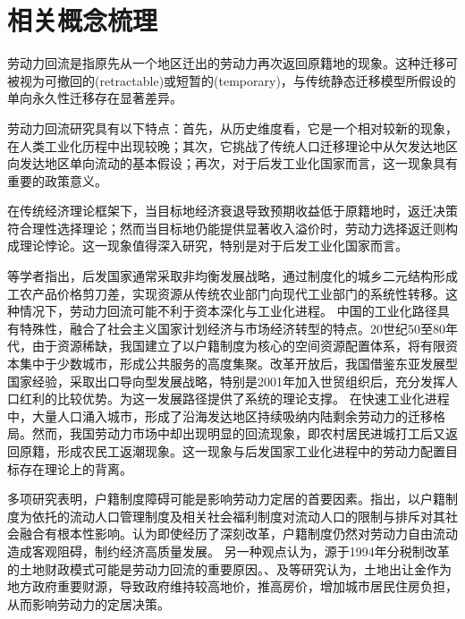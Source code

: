 \documentclass[master, final]{zufe-thesis}
\begin{document}
\section{相关概念梳理}
劳动力回流是指原先从一个地区迁出的劳动力再次返回原籍地的现象。这种迁移可被视为可撤回的(retractable)或短暂的(temporary)，与传统静态迁移模型所假设的单向永久性迁移存在显著差异。

劳动力回流研究具有以下特点：首先，从历史维度看，它是一个相对较新的现象，在人类工业化历程中出现较晚；其次，它挑战了传统人口迁移理论中从欠发达地区向发达地区单向流动的基本假设；再次，对于后发工业化国家而言，这一现象具有重要的政策意义。

在传统经济理论框架下，当目标地经济衰退导致预期收益低于原籍地时，返迁决策符合理性选择理论；然而当目标地仍能提供显著收入溢价时，劳动力选择返迁则构成理论悖论。这一现象值得深入研究，特别是对于后发工业化国家而言。

\textcite{CaiFangHuJiZhiDuYuLaoDongLiShiChangBaoHu2001}等学者指出，后发国家通常采取非均衡发展战略，通过制度化的城乡二元结构形成工农产品价格剪刀差，实现资源从传统农业部门向现代工业部门的系统性转移。这种情况下，劳动力回流可能不利于资本深化与工业化进程。
中国的工业化路径具有特殊性，融合了社会主义国家计划经济与市场经济转型的特点。20世纪50至80年代，由于资源稀缺，我国建立了以户籍制度为核心的空间资源配置体系，将有限资本集中于少数城市，形成公共服务的高度集聚。改革开放后，我国借鉴东亚发展型国家经验，采取出口导向型发展战略，特别是2001年加入世贸组织后，充分发挥人口红利的比较优势。\textcite{LinYiFuZhongGuoDeJingJiFaZhanZhanLueYuDiQuShouRuChaiJu2003}为这一发展路径提供了系统的理论支撑。
在快速工业化进程中，大量人口涌入城市，形成了沿海发达地区持续吸纳内陆剩余劳动力的迁移格局。然而，我国劳动力市场中却出现明显的回流现象，即农村居民进城打工后又返回原籍，形成农民工返潮现象。这一现象与后发国家工业化进程中的劳动力配置目标存在理论上的背离。

多项研究表明，户籍制度障碍可能是影响劳动力定居的首要因素。\textcite{RenYuanChengShiLiuDongRenKouDeSheHuiRongHeWenXianShuPing2006}指出，以户籍制度为依托的流动人口管理制度及相关社会福利制度对流动人口的限制与排斥对其社会融合有根本性影响。\textcite{LuYiLongHuKouHuanQiZuoYongMaHuJiZhiDuYuSheHuiFenCengHeLiuDong2008}认为即使经历了深刻改革，户籍制度仍然对劳动力自由流动造成客观阻碍，制约经济高质量发展。
另一种观点认为，源于1994年分税制改革的土地财政模式可能是劳动力回流的重要原因。\textcite{ChenYingFangNongMinGongZhiDuAnPaiYuShenFenRenTong2005}、\textcite{niehuihuaZhongguogaofangjiadexinzhengzhijingjixuejieshiYiZhengqihemou2013}及\textcite{YuJianXingDiFangFaZhanXingZhengFuDeXingWeiLuoJiJiZhiDuJiChu2012}等研究认为，土地出让金作为地方政府重要财源，导致政府维持较高地价，推高房价，增加城市居民住房负担，从而影响劳动力的定居决策。
\end{document}
